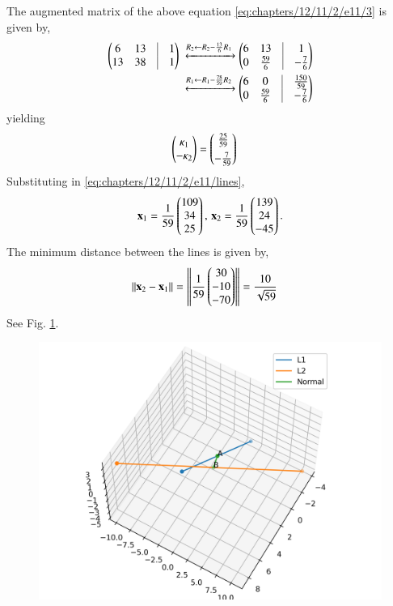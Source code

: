 The augmented matrix of the above equation \eqref{eq:chapters/12/11/2/e11/3} is given by,
\begin{align}
\myvec{6&13&\vrule&1\\13&38&\vrule&1}
\xleftrightarrow{R_2 \leftarrow R_2 - \frac{13}{6}R_1}
\myvec{6&13&\vrule&1 \\ 0&\frac{59}{6}&\vrule&-\frac{7}{6}}\\
\xleftrightarrow{R_1 \leftarrow R_1 - \frac{78}{59}R_2}
\myvec{6&0&\vrule&\frac{150}{59} \\ 0&\frac{59}{6}&\vrule&-\frac{7}{6}}
\end{align}
yielding
\begin{align}
	\begin{pmatrix}\kappa_1\\-\kappa_2\end{pmatrix} &= \begin{pmatrix}\frac{25}{59}\\[1ex]-\frac{7}{59}\end{pmatrix}
	\label{eq:chapters/12/11/2/e11/}
\end{align}
Substituting in \eqref{eq:chapters/12/11/2/e11/lines},
\begin{align}
\mathbf{x}_1 
= \frac{1}{59}\begin{pmatrix}109\\34\\25\end{pmatrix},\,
\mathbf{x}_2 
= \frac{1}{59}\begin{pmatrix}139\\24\\-45\end{pmatrix}.
\end{align}
The minimum distance between the lines is given by,
\begin{align}
\left\lVert\mathbf{x}_2-\mathbf{x}_1\right\rVert &= \left\lVert\frac{1}{59}\begin{pmatrix}30\\-10\\-70\end{pmatrix}\right\rVert
= \frac{10}{\sqrt{59}}
\end{align}
See Fig. 
	\ref{fig:chapters/12/11/2/e11/}.
\begin{figure}[!ht]
\centering
\includegraphics[width=\columnwidth]{chapters/12/11/2/e11/lsq/figs/skew.png}
\caption{}
	\label{fig:chapters/12/11/2/e11/}
\end{figure}
